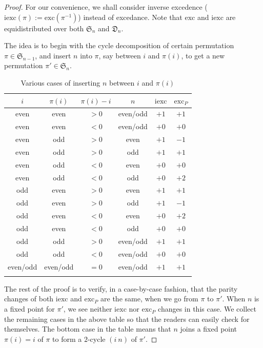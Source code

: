 \documentclass[11pt,reqno]{amsart}
\numberwithin{equation}{section}
\theoremstyle{plain}
\theoremstyle{definition}
\renewcommand{\S}{\mathfrak{S}}
\def\exc{\mathrm{exc}}
\def\iexc{\mathrm{iexc}}
\newcommand{\D}{\mathfrak{D}}
\begin{document}
\begin{proof}
For our convenience, we shall consider inverse excedence ($\iexc(\pi):=\exc(\pi^{-1})$) instead of excedance. Note that $\exc$ and $\iexc$ are equidistributed over both $\S_n$ and $\D_n$.

The idea is to begin with the cycle decomposition of certain permutation $\pi\in\S_{n-1}$, and insert $n$ into $\pi$, say between $i$ and $\pi(i)$, to get a new permutation $\pi'\in\S_n$.

\begin{table}[htb]
{%
\begin{tabular*}{3.8in}{cccccc}
\toprule
$i$ & $\pi(i)$ & $\pi(i)-i$ & $n$ & $\iexc$ & $\exc_P$\\
\midrule
even & even & $>0$ & even/odd & $+1$ & $+1$\\
even & even & $<0$ & even/odd & $+0$ & $+0$\\
even & odd & $>0$ & even & $+1$ & $-1$\\
even & odd & $>0$ & odd & $+1$ & $+1$\\
even & odd & $<0$ & even & $+0$ & $+0$\\
even & odd & $<0$ & odd & $+0$ & $+2$\\
odd & even & $>0$ & even & $+1$ & $+1$\\
odd & even & $>0$ & odd & $+1$ & $-1$\\
odd & even & $<0$ & even & $+0$ & $+2$\\
odd & even & $<0$ & odd & $+0$ & $+0$\\
odd & odd & $>0$ & even/odd & $+1$ & $+1$\\
odd & odd & $<0$ & even/odd & $+0$ & $+0$\\
even/odd & even/odd & $=0$ & even/odd & $+1$ & $+1$\\
\bottomrule\\
\end{tabular*}
}
\caption{Various cases of inserting $n$ between $i$ and $\pi(i)$}
\end{table}

The rest of the proof is to verify, in a case-by-case fashion, that the parity changes of both $\iexc$ and $\exc_P$ are the same, when we go from $\pi$ to $\pi'$. When $n$ is a fixed point for $\pi'$, we see neither $\iexc$ nor $\exc_P$ changes in this case. We collect the remaining cases in the above table so that the readers can easily check for themselves. The bottom case in the table means that $n$ joins a fixed point $\pi(i)=i$ of $\pi$ to form a $2$-cycle $(i~n)$ of $\pi'$.
\end{proof}
\end{document}
